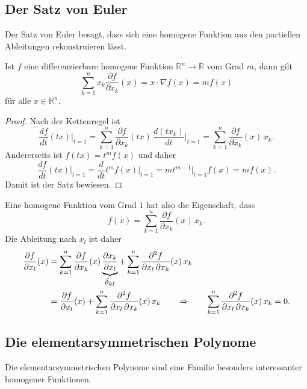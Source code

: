 %
%
\subsection{Der Satz von Euler}
Der Satz von Euler besagt, dass sich eine homogene Funktion aus den
partiellen Ableitungen rekonstruieren lässt.

\begin{satz}[Euler]
\label{buch:fuvar:homogen:satz:euler}
Ist $f$ eine differenzierbare homogene Funktion
$\mathbb{R}^n\to\mathbb{R}$ vom Grad $m$, dann gilt
\[
\sum_{k=1}^n x_k \frac{\partial f}{\partial x_k}(x)
=
x\cdot \nabla f(x)
=
m f(x)
\]
für alle $x\in\mathbb{R}^n$.
\end{satz}

\begin{proof}
Nach der Kettenregel ist
\[
\frac{df}{dt}(tx)\bigg|_{t=1}
=
\sum_{k=1}^n
\frac{\partial f}{\partial x_k}(tx)\,
\frac{d(tx_k)}{dt} \bigg|_{t=1}
=
\sum_{k=1}^n
\frac{\partial f}{\partial x_k}(x)\,x_k.
\]
Andererseits ist $f(tx)=t^mf(x)$ und daher
\[
\frac{df}{dt}(tx) \bigg|_{t=1}
=
\frac{d}{dt} t^m f(x)\bigg|_{t=1}
=
mt^{m-1}
\bigg|_{t=1}
f(x)
=
m f(x).
\]
Damit ist der Satz bewiesen.
\end{proof}

\begin{beispiel}
Eine homogene Funktion vom Grad $1$ hat also die Eigenschaft, dass
\[
f(x)
=
\sum_{k=1}^n
\frac{\partial f}{\partial x_k}(x)\, x_k.
\]
Die Ableitung nach $x_l$ ist daher
\begin{align*}
\frac{\partial f}{\partial x_l}(x)
&=
\sum_{k=1}^n
\frac{\partial f}{\partial x_k}(x)
\underbrace{\frac{\partial x_k}{\partial x_l}}_{\displaystyle\delta_{kl}}
+
\sum_{k=1}^n
\frac{\partial^2 f}{\partial x_l\,\partial x_k}(x)\, x_k
\\
&=
\frac{\partial f}{\partial x_l}(x)
+
\sum_{k=1}^n
\frac{\partial^2 f}{\partial x_l\,\partial x_k}(x)\, x_k
\qquad\Rightarrow\qquad
\sum_{k=1}^n 
\frac{\partial^2 f}{\partial x_l\,\partial x_k}(x)\, x_k
=
0.
\qedhere
\end{align*}
\end{beispiel}

%
%
\subsection{Die elementarsymmetrischen Polynome}
Die elementarsymmetrischen Polynome sind eine Familie besonders interessanter
homogener Funktionen.

